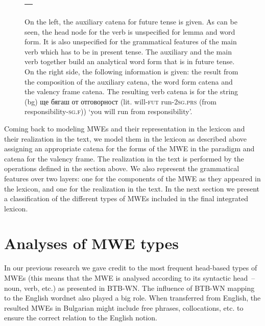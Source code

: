 \documentclass[output=paper,colorlinks,citecolor=brown]{langscibook}
\begin{document}
\begin{figure}
\begin{tabular}{|l|}
\begin{dependency}[theme = simple]
   \end{dependency} \\ \hline


\end{tabular}


 \caption{On the left, the auxiliary catena for future tense is given. As can be seen, the head node for the verb is unspecified for lemma and word form. It is also unspecified for the grammatical features of the main verb which has to be in present tense. The auxiliary and the main verb together build an analytical word form that is in future tense.
 On the right side, the following information is given: the result from the composition of the auxiliary catena, the word form catena and the valency frame catena.
 The resulting verb catena is for the string
 (bg) {ще бягаш от отговорност } (lit. will-\textsc{fut} run-\textsc{2sg.prs} (from responsibility-\textsc{sg.f})) {`you will run from responsibility'}.}

    \label{fig:LexEntryComp}
\end{figure}

Coming back to modeling MWEs and their representation in the lexicon and their realization in the text, we model them in the lexicon as described above assigning an appropriate catena for the forms of the MWE in the paradigm and catena for the valency frame. The realization in the text is performed by the operations defined in the section above. We also represent the grammatical features over two layers: one for the components of the MWE as they appeared in the lexicon, and one for the realization in the text. In the next section we present a classification of the different types of MWEs included in the final integrated lexicon.

\section{Analyses of MWE types}
\label{AnalysesOfMWETypesOS}

In our previous research we gave credit to the most frequent head-based types of MWEs (this means that the MWE is analysed according to its syntactic head~-- noun, verb, etc.) as presented in BTB-WN. The influence of BTB-WN mapping to the English wordnet also played a big role. When transferred from English, the resulted MWEs in Bulgarian might include free phrases, collocations, etc. to ensure the correct relation to the English notion.
\end{document}

